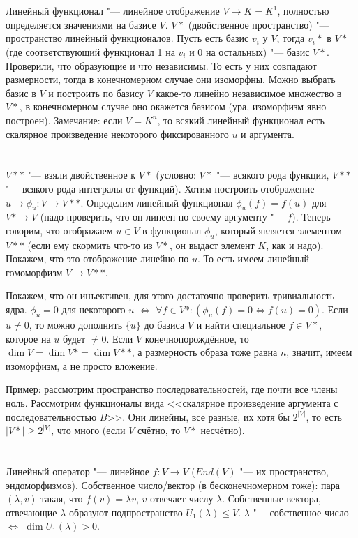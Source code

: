 \section{} %
Линейный функционал "--- линейное отображение $V \to K = K^1$, полностью определяется значениями на базисе $V$.
$V*$ (двойственное пространство) "--- пространство линейный функционалов.
Пусть есть базис $v_i$ у $V$, тогда $v_i*$ в $V*$ (где соответствующий функционал 1 на $v_i$ и 0 на остальных) "--- базис $V*$.
Проверили, что образующие и что независимы.
То есть у них совпадают размерности, тогда в конечномерном случае они изоморфны.
Можно выбрать базис в $V$ и построить по базису $V$ какое-то линейно независимое множество в $V*$, в конечномерном случае оно окажется базисом (ура, изоморфизм явно построен).
Замечание: если $V=K^n$, то всякий линейный функционал есть скалярное произведение некоторого фиксированного $u$ и аргумента.

\section{} %
$V**$ "--- взяли двойственное к $V*$ (условно: $V*$ "--- всякого рода функции, $V**$ "--- всякого рода интегралы от функций).
Хотим построить отображение $u \to \phi_u \colon V \to V**$.
Определим линейный функционал $\phi_u(f)=f(u)$ для $V* \to V$ (надо проверить, что он линеен по своему аргументу "--- $f$).
Теперь говорим, что отображаем $u \in V$ в функционал $\phi_u$, который является элементом $V**$ (если ему скормить что-то из $V*$, он выдаст элемент $K$, как и надо).
Покажем, что это отображение линейно по $u$.
То есть имеем линейный гомоморфизм $V \to V**$.

Покажем, что он инъективен, для этого достаточно проверить тривиальность ядра.
$\phi_u = 0$ для некоторого $u$ $\iff$ $\forall f \in V* \colon (\phi_u(f) = 0 \iff f(u)=0)$.
Если $u \neq 0$, то можно дополнить $\{ u \}$ до базиса $V$ и найти специальное $f \in V*$, которое на $u$ будет $\neq 0$.
Если $V$ конечнопорождённое, то $\dim V = \dim V* = \dim V**$, а размерность образа тоже равна $n$, значит, имеем изоморфизм, а не просто вложение.

Пример: рассмотрим пространство последовательностей, где почти все члены ноль.
Рассмотрим функционалы вида <<скалярное произведение аргумента с последовательностью $B$>>.
Они линейны, все разные, их хотя бы $2^{|V|}$, то есть $|V*|\ge2^{|V|}$, что много (если $V$ счётно, то $V*$ несчётно).

\section{} %
Линейный оператор "--- линейное $f \colon V \to V$ ($End(V)$ "--- их пространство, эндоморфизмов).
Собственное число/вектор (в бесконечномерном тоже): пара $(\lambda, v)$ такая, что $f(v)=\lambda v$, $v$ отвечает числу $\lambda$.
Собственные вектора, отвечающие $\lambda$ образуют подпространство $U_1(\lambda) \le V$.
$\lambda$ "--- собственное число $\iff$ $\dim U_1(\lambda) > 0$.

